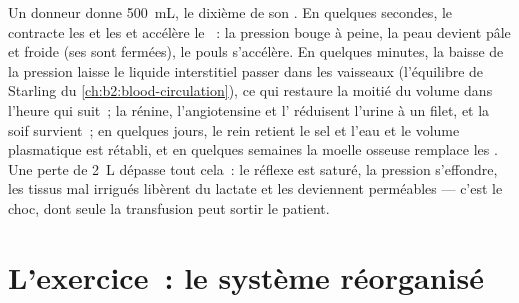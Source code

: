 \begin{example}\label{ex:b2:blood-pressure:haemorrhage}
Un donneur donne \qty{500}{mL}, le dixième de son . En quelques
secondes, le  contracte les  et les  et
accélère le ~: la pression bouge à peine, la peau devient pâle et
froide (ses  sont fermées), le pouls s'accélère. En quelques
minutes, la baisse de la pression  laisse le liquide
interstitiel passer dans les vaisseaux (l'équilibre de Starling du
\cref{ch:b2:blood-circulation}), ce qui restaure la moitié du volume dans
l'heure qui suit~; la rénine, l'angiotensine et l'
réduisent l'urine à un filet, et la soif survient~; en quelques jours,
le rein retient le sel et l'eau et le volume plasmatique est rétabli, et
en quelques semaines la moelle osseuse remplace les . Une perte
de \qty{2}{L} dépasse tout cela~: le réflexe est saturé, la pression
s'effondre, les tissus mal irrigués libèrent du lactate et les
 deviennent perméables --- c'est le choc, dont seule la
transfusion peut sortir le patient.
\end{example}

\section{L'exercice~: le système réorganisé}

